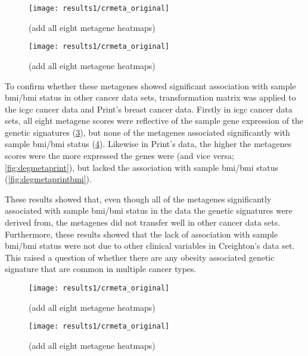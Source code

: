 \begin{figure}[htp!]
	\centering
	\texttt{[image: results1/crmeta\_original]}
	\caption[Novel obesity associated metagenes in Creighton's data]{(add all eight metagene heatmaps)}
	\label{fig:degmetacr}
\end{figure}

\begin{figure}[htp!]
	\centering
	\texttt{[image: results1/crmeta\_original]}
	\caption[Novel obesity associated metagenes in Creighton's data]{(add all eight metagene heatmaps)}
	\label{fig:degmetacrbmi}
\end{figure}

To confirm whether these metagenes showed significant association with sample \gls{bmi}/\gls{bmi} status in other cancer data sets, transformation matrix was applied to the \gls{icgc} cancer data and Print's breast cancer data.
Firstly in \gls{icgc} cancer data sets, all eight metagene scores were reflective of the sample gene expression of the genetic signatures (\cref{fig:degmetaicgc}), but none of the metagenes associated significantly with sample \gls{bmi}/\gls{bmi} status (\cref{fig:degmetaicgcbmi}).
Likewise in Print's data, the higher the metagenes scores were the more expressed the genes were (and vice versa; \cref{fig:degmetaprint}), but lacked the association with sample \gls{bmi}/\gls{bmi} status (\cref{fig:degmetaprintbmi}).

These results showed that, even though all of the metagenes significantly associated with sample \gls{bmi}/\gls{bmi} status in the data the genetic signatures were derived from, the metagenes did not transfer well in other cancer data sets.
Furthermore, these results showed that the lack of association with sample \gls{bmi}/\gls{bmi} status were not due to other clinical variables in Creighton's data set.
This raised a question of whether there are any obesity associated genetic signature that are common in multiple cancer types.


\begin{figure}[htp!]
	\centering
	\texttt{[image: results1/crmeta\_original]}
	\caption[Novel obesity associated metagenes in \gls{icgc} data]{(add all eight metagene heatmaps)}
	\label{fig:degmetaicgc}
\end{figure}

\begin{figure}[htp!]
	\centering
	\texttt{[image: results1/crmeta\_original]}
	\caption[Novel obesity associated metagenes in \gls{icgc} data]{(add all eight metagene heatmaps)}
	\label{fig:degmetaicgcbmi}
\end{figure}

